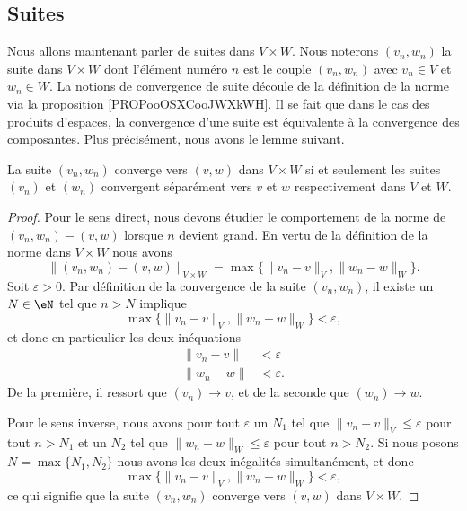 \subsection{Suites}

Nous allons maintenant parler de suites dans \( V\times W\). Nous noterons \( (v_n,w_n)\) la suite dans \( V\times W\) dont l'élément numéro \( n\) est le couple \( (v_n,w_n)\) avec \( v_n\in V\) et \( w_n\in W\). La notions de convergence de suite découle de la définition de la norme via la proposition \ref{PROPooOSXCooJWXkWH}. Il se fait que dans le cas des produits d'espaces, la convergence d'une suite est équivalente à la convergence des composantes. Plus précisément, nous avons le lemme suivant.
\begin{lemma}       \label{LemCvVxWcvVW}
	La suite \( (v_n,w_n)\) converge vers \( (v,w)\) dans \( V\times W\) si et seulement les suites \( (v_n)\) et \( (w_n)\) convergent séparément vers \( v\) et \( w\) respectivement dans \( V\) et \( W\).
\end{lemma}

\begin{proof}
	Pour le sens direct, nous devons étudier le comportement de la norme de \( (v_n,w_n)-(v,w)\) lorsque \( n\) devient grand. En vertu de la définition de la norme dans \( V\times W\) nous avons
	\begin{equation}
		\Big\| (v_n,w_n)-(v,w) \Big\|_{V\times W}=\max\big\{ \| v_n-v \|_V,\| w_n-w \|_W \big\}.
	\end{equation}
	Soit \( \varepsilon>0\). Par définition de la convergence de la suite \( (v_n,w_n)\), il existe un \( N\in\eN\) tel que \( n>N\) implique
	\begin{equation}
		\max\big\{ \| v_n-v \|_V,\| w_n-w \|_W \big\}<\varepsilon,
	\end{equation}
	et donc en particulier les deux inéquations
	\begin{subequations}
		\begin{align}
			\| v_n-v \| & <\varepsilon  \\
			\| w_n-w \| & <\varepsilon.
		\end{align}
	\end{subequations}
	De la première, il ressort que \( (v_n)\to v\), et de la seconde que \( (w_n)\to w\).

	Pour le sens inverse, nous avons pour tout \( \varepsilon\) un \( N_1\) tel que \( \| v_n-v \|_V\leq\varepsilon\) pour tout \( n>N_1\) et un \( N_2\) tel que \( \| w_n-w \|_W\leq\varepsilon\) pour tout \( n>N_2\). Si nous posons \( N=\max\{ N_1,N_2 \}\) nous avons les deux inégalités simultanément, et donc
	\begin{equation}
		\max\big\{ \| v_n-v \|_V,\| w_n-w \|_W \big\}<\varepsilon,
	\end{equation}
	ce qui signifie que la suite \( (v_n,w_n)\) converge vers \( (v,w)\) dans \( V\times W\).
\end{proof}

